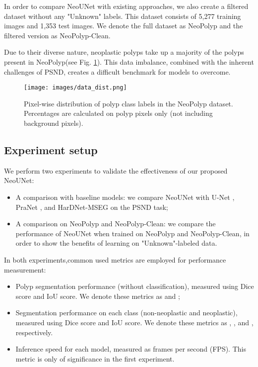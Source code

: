 \documentclass[runningheads]{llncs}
\newcommand{\ModelName}{NeoUNet\xspace}
\newcommand{\DatasetName}{NeoPolyp\xspace}
\newcommand{\CleanDatasetName}{NeoPolyp-Clean\xspace}
\begin{document}
	In order to compare \ModelName with existing approaches, we also create a filtered dataset without any "Unknown" labels. This dataset consists of 5,277 training images and 1,353 test images. We denote the full dataset as \DatasetName and the filtered version as \CleanDatasetName{}.

	Due to their diverse nature, neoplastic polyps take up a majority of the polyps present in \DatasetName (see Fig. \ref{fig:data_dist}). This data imbalance, combined with the inherent challenges of PSND, creates a difficult benchmark for models to overcome.

	\begin{figure}[]
		\centering
		\texttt{[image: images/data\_dist.png]}
		\caption{Pixel-wise distribution of polyp class labels in the \DatasetName dataset. Percentages are calculated on polyp pixels only (not including background pixels).}
		\label{fig:data_dist}
	\end{figure}

	\subsection{Experiment setup}
	We perform two experiments to validate the effectiveness of our proposed \ModelName:
	\begin{itemize}
		\item A comparison with baseline models: we compare \ModelName with U-Net \cite{ronneberger2015u}, PraNet \cite{fan2020pranet}, and HarDNet-MSEG \cite{huang2021hardnet} on the PSND task;
		\item A comparison on \DatasetName and \CleanDatasetName{}: we compare the performance of \ModelName when trained on \DatasetName and \CleanDatasetName{}, in order to show the benefits of learning on "Unknown"-labeled data.
	\end{itemize}

	In both experiments,common used metrics are employed for performance measurement:
	\begin{itemize}
		\item Polyp segmentation performance (without classification), measured using Dice score and IoU score. We denote these metrics as  and ;
		\item Segmentation performance on each class (non-neoplastic and neoplastic), measured using Dice score and IoU score. We denote these metrics as , ,  and , respectively.
		\item Inference speed for each model, measured as frames per second (FPS). This metric is only of significance in the first experiment.
	\end{itemize}
\end{document}
